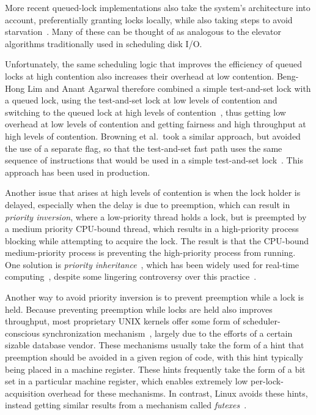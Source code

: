 More recent queued-lock implementations also take the system's architecture
into account, preferentially granting locks locally, while also taking
steps to avoid
starvation~\cite{McKenney02e,radovic03hierarchical,radovic02efficient,BenJackson02,McKenney02d}.
Many of these can be thought of as analogous to the elevator algorithms
traditionally used in scheduling disk I/O.

Unfortunately, the same scheduling logic that improves the efficiency
of queued locks at high contention also increases their overhead at
low contention.
Beng-Hong Lim and Anant Agarwal therefore combined a simple test-and-set
lock with a queued lock, using the test-and-set lock at low levels of
contention and switching to the queued lock at high levels of
contention~\cite{BengHongLim94}, thus getting low overhead at low levels
of contention and getting fairness and high throughput at high levels
of contention.
Browning et al.\ took a similar approach, but avoided the use of a separate
flag, so that the test-and-set fast path uses the same sequence of
instructions that would be used in a simple test-and-set
lock~\cite{LukeBrowning2005SimpleLockNUMAAware}.
This approach has been used in production.

Another issue that arises at high levels of contention is when the
lock holder is delayed, especially when the delay is due to
preemption, which can result in \emph{priority inversion},
where a low-priority thread holds a lock, but is preempted
by a medium priority CPU-bound thread, which results in
a high-priority process blocking while attempting to acquire the
lock.
The result is that the CPU-bound medium-priority process is preventing the
high-priority process from running.
One solution is \emph{priority inheritance}~\cite{Lampson1980Mesa},
which has been widely used for real-time
computing~\cite{LuiSha1990PriorityInheritance,JonathanCorbet2006PriorityInheritance},
despite some lingering controversy over this
practice~\cite{Yodaiken2004FSM,DougLocke2002a}.

Another way to avoid priority inversion is to prevent preemption
while a lock is held.
Because preventing preemption while locks are held also improves throughput,
most proprietary UNIX kernels offer some form of scheduler-conscious
synchronization mechanism~\cite{Kontothanassis97a},
largely due to the efforts of a certain sizable database vendor.
These mechanisms usually take the form of a hint that preemption
should be avoided in a given region of code, with this hint typically
being placed in a machine register.
These hints frequently take the form of a bit set in a particular
machine register, which enables extremely low per-lock-acquisition overhead
for these mechanisms.
In contrast, Linux avoids these hints, instead getting
similar results from a mechanism called
\emph{futexes}~\cite{HubertusFrancke2002Futex,IngoMolnar2006RobustFutexes,StevenRostedt2006piFutexes,UlrichDrepper2011Futexes}.

